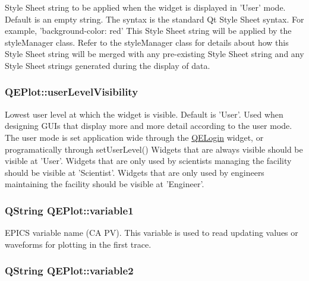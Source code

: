 \label{classQEPlot_a65f72e73ac50f4a85fb5cce783299b49}
Style Sheet string to be applied when the widget is displayed in 'User' mode. Default is an empty string. The syntax is the standard Qt Style Sheet syntax. For example, 'background-\/color: red' This Style Sheet string will be applied by the styleManager class. Refer to the styleManager class for details about how this Style Sheet string will be merged with any pre-\/existing Style Sheet string and any Style Sheet strings generated during the display of data. \hypertarget{classQEPlot_acef17c83a058146755dda5a418624b60}{
\subsubsection[{userLevelVisibility}]{ QEPlot::userLevelVisibility}}
\label{classQEPlot_acef17c83a058146755dda5a418624b60}
Lowest user level at which the widget is visible. Default is 'User'. Used when designing GUIs that display more and more detail according to the user mode. The user mode is set application wide through the \hyperlink{classQELogin}{QELogin} widget, or programatically through setUserLevel() Widgets that are always visible should be visible at 'User'. Widgets that are only used by scientists managing the facility should be visible at 'Scientist'. Widgets that are only used by engineers maintaining the facility should be visible at 'Engineer'. \hypertarget{classQEPlot_ade9ed52d2597230634d7ad4a32cb7150}{
\subsubsection[{variable1}]{\setlength{\rightskip}{0pt plus 5cm}QString QEPlot::variable1}}
\label{classQEPlot_ade9ed52d2597230634d7ad4a32cb7150}
EPICS variable name (CA PV). This variable is used to read updating values or waveforms for plotting in the first trace. \hypertarget{classQEPlot_aee6877cd682d63bfbf61575560a70390}{
\subsubsection[{variable2}]{\setlength{\rightskip}{0pt plus 5cm}QString QEPlot::variable2}}
